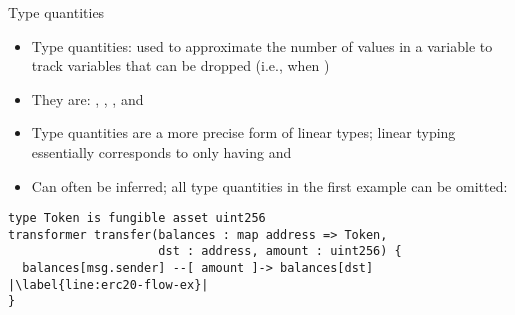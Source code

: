 \documentclass[leqno,presentation,usenames,dvipsnames]{beamer}
\begin{document}
\begin{frame}[fragile]{Type quantities}
    \begin{itemize}
        \item Type quantities: used to approximate the number of values in a variable to track  variables that can be dropped (i.e., when )
        \item They are: , , , and 
        \item Type quantities are a more precise form of linear types; linear typing essentially corresponds to only having  and 
        \item Can often be inferred; all type quantities in the first example can be omitted:
    \end{itemize}

\begin{lstlisting}[language=flow, xleftmargin=-0.5em, basicstyle=\footnotesize\ttfamily]
type Token is fungible asset uint256
transformer transfer(balances : map address => Token,
                     dst : address, amount : uint256) {
  balances[msg.sender] --[ amount ]-> balances[dst] |\label{line:erc20-flow-ex}|
}
\end{lstlisting}
\end{frame}
\end{document}
